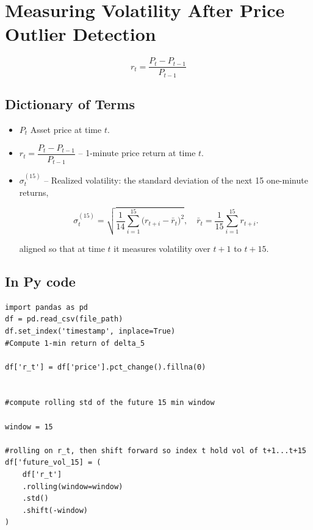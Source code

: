 \documentclass[12pt]{article}
\begin{document}
\newpage





\section*{Measuring Volatility After Price Outlier Detection}


\begin{equation}\label{eq:price_return}
    r_t = \frac{P_{t} - P_{t-1}}{P_{t-1}}
\end{equation}


\subsection*{Dictionary of Terms}

\begin{itemize}
    \item $P_t$  
      Asset price at time $t$.
    \item $r_t = \dfrac{P_t - P_{t-1}}{P_{t-1}}$  
      – 1-minute price return at time $t$.
    \item $\sigma^{\mathrm{(15)}}_{t}$  
      – Realized volatility: the standard deviation of the next 15 one-minute returns,
      
      

      
      \begin{equation}\label{eq:realized-vol}
        \sigma^{\mathrm{(15)}}_{t}
        = \sqrt{\frac{1}{14}\sum_{i=1}^{15}\bigl(r_{t+i}-\bar r_{t}\bigr)^{2}},
        \quad
        \bar r_{t} = \frac{1}{15}\sum_{i=1}^{15} r_{t+i}.
      \end{equation}
      



      aligned so that at time $t$ it measures volatility over $t+1$ to $t+15$.
\end{itemize}



\subsection*{In Py code}

\begin{verbatim}
import pandas as pd
df = pd.read_csv(file_path)
df.set_index('timestamp', inplace=True)
#Compute 1-min return of delta_5

df['r_t'] = df['price'].pct_change().fillna(0)


#compute rolling std of the future 15 min window

window = 15

#rolling on r_t, then shift forward so index t hold vol of t+1...t+15
df['future_vol_15] = (
    df['r_t']
    .rolling(window=window)
    .std()
    .shift(-window)
)
\end{verbatim}
\end{document}
